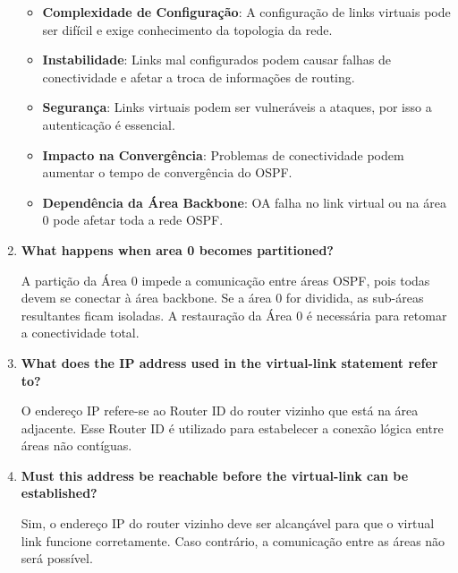 \documentclass[11pt,english, openright, oneside]{book}
\begin{document}
\begin{enumerate}
  \begin{itemize}
    \item \textbf{Complexidade de Configuração}: A configuração de links virtuais pode ser difícil e exige conhecimento da topologia da rede.
    \item \textbf{Instabilidade}: Links mal configurados podem causar falhas de conectividade e afetar a troca de informações de routing.
    \item \textbf{Segurança}: Links virtuais podem ser vulneráveis a ataques, por isso a autenticação é essencial.
    \item \textbf{Impacto na Convergência}: Problemas de conectividade podem aumentar o tempo de convergência do OSPF.
    \item \textbf{Dependência da Área Backbone}: OA falha no link virtual ou na área 0 pode afetar toda a rede OSPF.
  \end{itemize}
  \vspace{0.2cm}

  \item \textbf{What happens when area 0 becomes partitioned?}
  \vspace{0.2cm}

  \par A partição da Área 0 impede a comunicação entre áreas OSPF, pois todas devem se conectar à área backbone. Se a área 0 for dividida, as sub-áreas resultantes ficam isoladas. A restauração da Área 0 é necessária para retomar a conectividade total.
  \vspace{0.2cm}

  \item \textbf{What does the IP address used in the virtual-link statement refer to?}
  \vspace{0.2cm}

  \par O endereço IP refere-se ao Router ID do router vizinho que está na área adjacente. Esse Router ID é utilizado para estabelecer a conexão lógica entre áreas não contíguas.
  \vspace{0.2cm}

  \item \textbf{Must this address be reachable before the virtual-link can be established?}
  \vspace{0.2cm}

  \par Sim, o endereço IP do router vizinho deve ser alcançável para que o virtual link funcione corretamente. Caso contrário, a comunicação entre as áreas não será possível.
  \vspace{0.2cm}


\end{enumerate}
\end{document}
